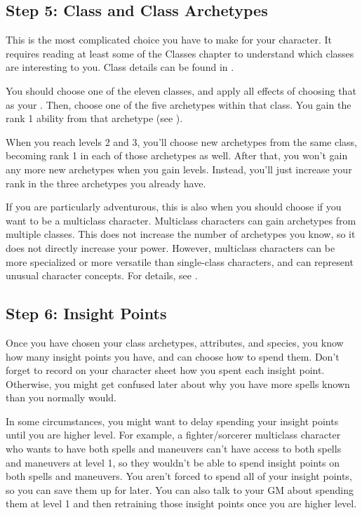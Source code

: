   \subsection{Step 5: Class and Class Archetypes}
    This is the most complicated choice you have to make for your character.
    It requires reading at least some of the Classes chapter to understand which classes are interesting to you.
    Class details can be found in .

    You should choose one of the eleven classes, and apply all effects of choosing that as your .
    Then, choose one of the five archetypes within that class.
    You gain the rank 1 ability from that archetype (see ).

    When you reach levels 2 and 3, you'll choose new archetypes from the same class, becoming rank 1 in each of those archetypes as well.
    After that, you won't gain any more new archetypes when you gain levels.
    Instead, you'll just increase your rank in the three archetypes you already have.

    If you are particularly adventurous, this is also when you should choose if you want to be a multiclass character.
    Multiclass characters can gain archetypes from multiple classes.
    This does not increase the number of archetypes you know, so it does not directly increase your power.
    However, multiclass characters can be more specialized or more versatile than single-class characters, and can represent unusual character concepts.
    For details, see .

  \subsection{Step 6: Insight Points}
    Once you have chosen your class archetypes, attributes, and species, you know how many insight points you have, and can choose how to spend them.
    Don't forget to record on your character sheet how you spent each insight point.
    Otherwise, you might get confused later about why you have more spells known than you normally would.

    In some circumstances, you might want to delay spending your insight points until you are higher level.
    For example, a fighter/sorcerer multiclass character who wants to have both spells and maneuvers can't have access to both spells and maneuvers at level 1, so they wouldn't be able to spend insight points on both spells and maneuvers.
    You aren't forced to spend all of your insight points, so you can save them up for later.
    You can also talk to your GM about spending them at level 1 and then retraining those insight points once you are higher level.


